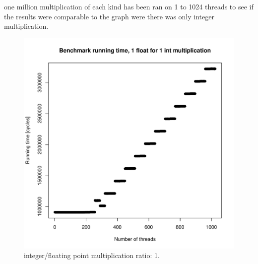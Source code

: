 \documentclass{report}
\def \scalingfactor{.8}
\begin{document}
	one million multiplication of each kind has been ran on 1 to 1024 threads to
    see if the results were comparable to the graph were there was only integer multiplication.
	\begin{figure}[h]
		\centering
		\vspace{-20pt}
    			\includegraphics[width=\scalingfactor\linewidth]{"graphics/running_times_ratio11"}
		\vspace{-15pt}
		\captionsetup{justification=centering}
		\caption{integer/floating point multiplication ratio: 1.}
	\end{figure}
	\pagebreak
\end{document}
